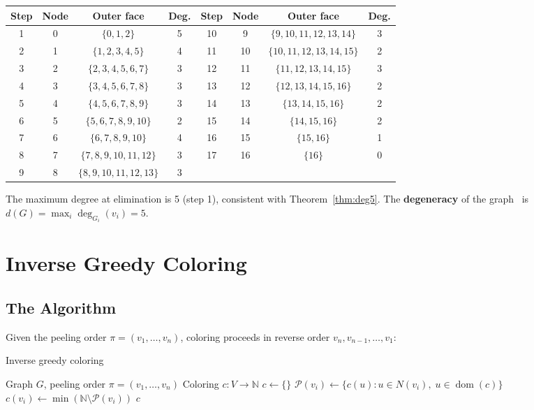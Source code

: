 \documentclass[12pt,letterpaper]{article}
\theoremstyle{plain}
\theoremstyle{definition}
\theoremstyle{remark}
\newcommand{\N}{\mathbb{N}}
\newcommand{\degr}{\operatorname{deg}}
\newcommand{\dom}{\operatorname{dom}}
\begin{document}
\begin{center}
\begin{tabular}{cccc|cccc}
\toprule
\textbf{Step} & \textbf{Node} & \textbf{Outer face} & \textbf{Deg.} &
\textbf{Step} & \textbf{Node} & \textbf{Outer face} & \textbf{Deg.} \\
\midrule
 1 &  0 & $\{0,1,2\}$           & 5 & 10 &  9 & $\{9,10,11,12,13,14\}$  & 3 \\
 2 &  1 & $\{1,2,3,4,5\}$       & 4 & 11 & 10 & $\{10,11,12,13,14,15\}$ & 2 \\
 3 &  2 & $\{2,3,4,5,6,7\}$     & 3 & 12 & 11 & $\{11,12,13,14,15\}$    & 3 \\
 4 &  3 & $\{3,4,5,6,7,8\}$     & 3 & 13 & 12 & $\{12,13,14,15,16\}$    & 2 \\
 5 &  4 & $\{4,5,6,7,8,9\}$     & 3 & 14 & 13 & $\{13,14,15,16\}$       & 2 \\
 6 &  5 & $\{5,6,7,8,9,10\}$    & 2 & 15 & 14 & $\{14,15,16\}$          & 2 \\
 7 &  6 & $\{6,7,8,9,10\}$      & 4 & 16 & 15 & $\{15,16\}$             & 1 \\
 8 &  7 & $\{7,8,9,10,11,12\}$  & 3 & 17 & 16 & $\{16\}$                & 0 \\
 9 &  8 & $\{8,9,10,11,12,13\}$ & 3 &    &    &                          &   \\
\bottomrule
\end{tabular}
\end{center}

The maximum degree at elimination is 5 (step 1), consistent with
Theorem~\ref{thm:deg5}. The \textbf{degeneracy} of the graph~\cite{matula1983}
is $d(G) = \max_i \degr_{G_i}(v_i) = 5$.

\section{Inverse Greedy Coloring}
\label{sec:greedy}

\subsection{The Algorithm}

Given the peeling order $\pi = (v_1, \ldots, v_n)$, coloring proceeds in
reverse order $v_n, v_{n-1}, \ldots, v_1$:

\begin{algorithm}[H]
\caption{Inverse greedy coloring}
\label{alg:greedy}
\begin{algorithmic}[1]
\Require Graph $G$, peeling order $\pi = (v_1, \ldots, v_n)$
\Ensure Coloring $c: V \to \N$
\State $c \gets \{\}$
    \State $\mathcal{P}(v_i) \gets \{c(u) : u \in N(v_i),\; u \in \dom(c)\}$
    \State $c(v_i) \gets \min(\N \setminus \mathcal{P}(v_i))$
\EndFor
\State \Return $c$
\end{algorithmic}
\end{algorithm}
\end{document}
